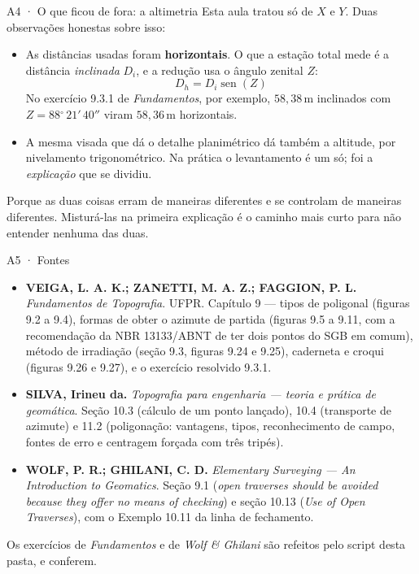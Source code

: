 \documentclass[aspectratio=169,11pt]{beamer}
\newcommand{\gr}[3]{#1\ensuremath{^\circ}\,#2\ensuremath{'}\,#3\ensuremath{''}}
\begin{document}
\begin{frame}{A4 · O que ficou de fora: a altimetria}
  \small
  Esta aula tratou só de $X$ e $Y$. Duas observações honestas sobre isso:
  \medskip
  \begin{itemize}
    \item As distâncias usadas foram \textbf{horizontais}. O que a estação total mede é a
          distância \emph{inclinada} $D_i$, e a redução usa o ângulo zenital $Z$:
          \[ D_h = D_i \operatorname{sen}(Z) \]
          No exercício 9.3.1 de \emph{Fundamentos}, por exemplo, $58{,}38$\,m inclinados com
          $Z = \gr{88}{21}{40}$ viram $58{,}36$\,m horizontais.
    \item A mesma visada que dá o detalhe planimétrico dá também a altitude, por
          nivelamento trigonométrico. Na prática o levantamento é um só; foi a
          \emph{explicação} que se dividiu.
  \end{itemize}
  \medskip
  \begin{ideia}[title={Por que separar}]
    Porque as duas coisas erram de maneiras diferentes e se controlam de maneiras
    diferentes. Misturá-las na primeira explicação é o caminho mais curto para não entender
    nenhuma das duas.
  \end{ideia}
\end{frame}

\begin{frame}{A5 · Fontes}
  \scriptsize
  \begin{itemize}
    \item \textbf{VEIGA, L. A. K.; ZANETTI, M. A. Z.; FAGGION, P. L.}
          \emph{Fundamentos de Topografia}. UFPR. Capítulo 9 --- tipos de poligonal
          (figuras 9.2 a 9.4), formas de obter o azimute de partida (figuras 9.5 a 9.11,
          com a recomendação da NBR 13133/ABNT de ter dois pontos do SGB em comum), método
          de irradiação (seção 9.3, figuras 9.24 e 9.25), caderneta e croqui (figuras 9.26 e
          9.27), e o exercício resolvido 9.3.1.
    \item \textbf{SILVA, Irineu da.} \emph{Topografia para engenharia --- teoria e prática
          de geomática}. Seção 10.3 (cálculo de um ponto lançado), 10.4 (transporte de
          azimute) e 11.2 (poligonação: vantagens, tipos, reconhecimento de campo, fontes de
          erro e centragem forçada com três tripés).
    \item \textbf{WOLF, P. R.; GHILANI, C. D.} \emph{Elementary Surveying --- An
          Introduction to Geomatics}. Seção 9.1 (\emph{open traverses should be avoided
          because they offer no means of checking}) e seção 10.13 (\emph{Use of Open
          Traverses}), com o Exemplo 10.11 da linha de fechamento.
  \end{itemize}
  \medskip
  \normalsize
  \centering
  Os exercícios de \emph{Fundamentos} e de \emph{Wolf \& Ghilani} são refeitos pelo script
  desta pasta, e conferem.
\end{frame}
\end{document}
